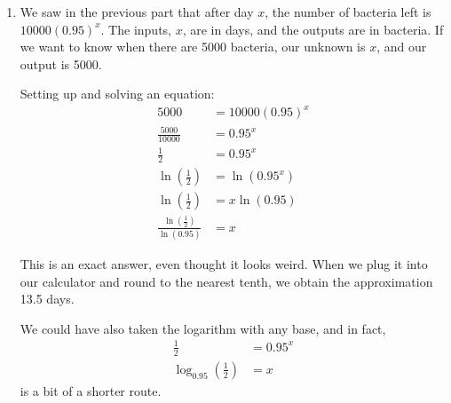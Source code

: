 \documentclass[noauthor]{ximera}
\begin{document}
\begin{problem}
\begin{explanation}
\begin{enumerate}
    \textbf{Percent Remaining:} Another way to think about it is to realize that 95\% of the bacteria are left.

    After 1 day, \(10000(0.95) = 9500\) bacteria remain. After 2 days, there are \(9500(0.95)\) bacteria left, but 
    9500 can also be written unsimplifed, so this is\(10000(0.95)(0.95) = 10000(0.95)^2\). Similarly, after 5 days, there are 
    \(10000(0.95)^5 \approx 8574\) bacteria left. 

    \item We saw in the previous part that after day \(x\), the number of bacteria left is \(10000(0.95)^x\). The inputs, \(x\), 
    are in days, and the outputs are in bacteria. If we want to know when there are 5000 bacteria, our unknown is \(x\), and our output is 5000.

    Setting up and solving an equation:
    \begin{align*}
        5000 & = 10000(0.95)^x \\
        \frac{5000}{10000} & = 0.95^x \\
        \frac{1}{2} & = 0.95^x \\
        \ln\left(\frac{1}{2}\right) & = \ln(0.95^x) \\
        \ln\left(\frac{1}{2}\right) & = x \ln(0.95) \\
        \frac{\ln\left(\frac{1}{2}\right)}{\ln(0.95)} & = x
    \end{align*}

    This is an exact answer, even thought it looks weird. When we plug it into our calculator and round
    to the nearest tenth, we obtain the approximation 13.5 days. 

    We could have also taken the logarithm with any base, and in fact, 
    \begin{align*}
        \frac{1}{2} & = 0.95^x \\
        \log_{0.95}\left(\frac{1}{2}\right) & = x
    \end{align*}
    is a bit of a shorter route.

\end{enumerate}
\end{explanation}
\end{problem}
\end{document}
